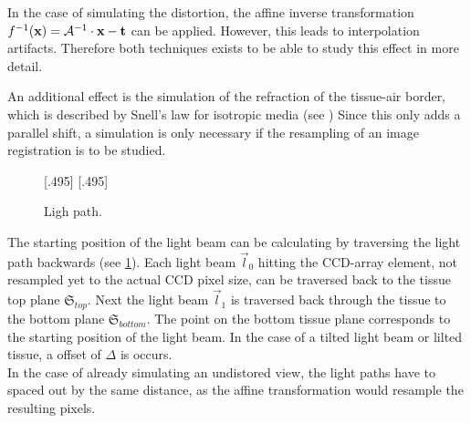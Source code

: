 In the case of simulating the distortion, the affine inverse transformation $f^{-1}(\mathbf{x}) = \mathcal{A}^{-1} \cdot \mathbf{x} - \mathbf{t}$ can be applied.
However, this leads to interpolation artifacts.
Therefore both techniques exists to be able to study this effect in more detail.
\par
% 
An additional effect is the simulation of the refraction of the tissue-air border, which is described by Snell's law for isotropic media (see \dummy{})
Since this only adds a parallel shift, a simulation is only necessary if the resampling of an image registration is to be studied.
\par
% 
\begin{figure}[!t]
\setlength{\tikzwidth}{0.42\textwidth}
[.495\textwidth]{
\def\tilt{0}
\def\nindex{2.25}
}\hfill
{}[.495\textwidth]{
}
\caption[Light path]{Ligh path.}
\label{fig:tilted_side_view}
\end{figure}
% 
The starting position of the light beam can be calculating by traversing the light path backwards (see \cref{fig:tilted_side_view}).
Each light beam $\vec{l}_0$ hitting the \ac{CCD}-array element, not resampled yet to the actual \ac{CCD} pixel size, can be traversed back to the tissue top plane $\mathfrak{S}_{top}$.
Next the light beam $\vec{l}_1$ is traversed back through the tissue to the bottom plane $\mathfrak{S}_{bottom}$.
The point on the bottom tissue plane corresponds to the starting position of the light beam.
In the case of a tilted light beam or lilted tissue, a offset of $\Delta$ is occurs.
\\
% 
In the case of already simulating an undistored view, the light paths have to spaced out by the same distance, as the affine transformation would resample the resulting pixels.
% 
\begin{lstfloat}[!ht]
	
	\caption{Pseudocode simulation }
	\label{alg:simulation}
\end{lstfloat}
% 
